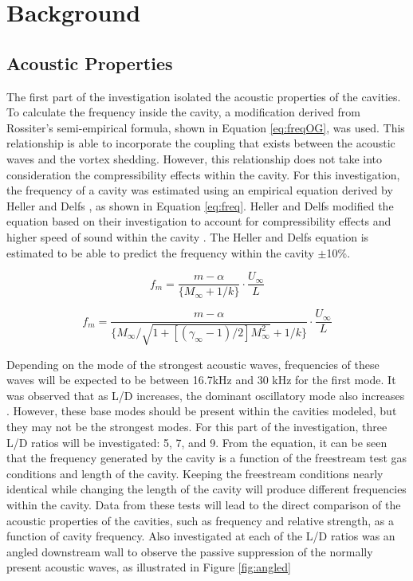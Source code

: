 \section{Background}

\subsection{Acoustic Properties}

The first part of the investigation isolated the acoustic properties of the cavities. To calculate the frequency inside the cavity, a modification derived from Rossiter's semi-empirical formula, shown in Equation \ref{eq:freqOG}, was used. This relationship is able to incorporate the coupling that exists between the acoustic waves and the vortex shedding\cite{rossiter1964wind}. However, this relationship does not take into consideration the compressibility effects within the cavity. For this investigation, the frequency of a cavity was estimated using an empirical equation derived by Heller and Delfs \cite{heller1996letter}, as shown in Equation \ref{eq:freq}.  Heller and Delfs modified the equation based on their investigation to account for compressibility effects and higher speed of sound within the cavity \cite{ben2001cavity}. The Heller and Delfs equation is estimated to be able to predict the frequency within the cavity $\pm$10\%\cite{heller1996letter}.

\begin{equation}
f_m = \frac{m-\alpha}{\{M_{\infty}+1/k\}} \cdot \frac{U_\infty}{L}
\label{eq:freqOG}
\end{equation}

\begin{equation}
f_m = \frac{m-\alpha}{\{M_{\infty}/\sqrt{1+[(\gamma_{\infty}-1)/2]M_{\infty}^2}+1/k\}} \cdot \frac{U_\infty}{L}
\label{eq:freq}
\end{equation}

Depending on the mode of the strongest acoustic waves, frequencies of these waves will be expected to be between 16.7kHz and 30 kHz for the first mode. It was observed that as L/D increases, the dominant oscillatory mode also increases \cite{ben2001cavity}. However, these base modes should be present within the cavities modeled, but they may not be the strongest modes. For this part of the investigation, three L/D ratios will be investigated: 5, 7, and 9. From the equation, it can be seen that the frequency generated by the cavity is a function of the freestream test gas conditions and length of the cavity. Keeping the freestream conditions nearly identical while changing the length of the cavity will produce different frequencies within the cavity. Data from these tests will lead to the direct comparison of the acoustic properties of the cavities, such as frequency and relative strength, as a function of cavity frequency. Also investigated at each of the L/D ratios was an angled downstream wall to observe the passive suppression of the normally present acoustic waves, as illustrated in Figure \ref{fig:angled}

